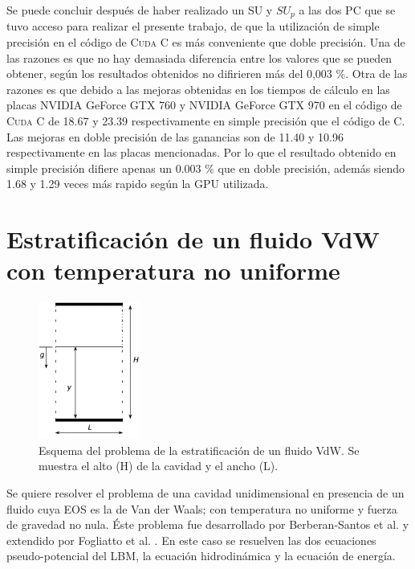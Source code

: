 Se puede concluir después de haber realizado un SU y $SU_p$ a las dos PC que se tuvo acceso para realizar el presente trabajo, de que la utilización de simple precisión en el código de \textsc{Cuda C} es más conveniente que doble precisión. Una de las razones es que no hay demasiada diferencia entre los valores que se pueden obtener, según los resultados obtenidos no difirieren más del 0,003 \%. Otra de las razones es que debido a las mejoras obtenidas en los tiempos de cálculo en las placas NVIDIA GeForce GTX 760 y NVIDIA GeForce GTX 970 en el código de \textsc{Cuda C} de 18.67 y 23.39 respectivamente en simple precisión que el código de \textsc{C}. Las mejoras en doble precisión de las ganancias son de 11.40 y 10.96 respectivamente en las placas mencionadas. Por lo que el resultado obtenido en simple precisión difiere apenas un 0.003 \% que en doble precisión, además siendo 1.68 y 1.29 veces más rapido según la GPU utilizada.

\newpage

\section{Estratificación de un fluido VdW con temperatura no uniforme}

\begin{figure}[htbp]
	\centering
	\includegraphics[width=0.3\textwidth]{figs/cap4/esquema_problema_VdW}
	\caption{Esquema del problema de la estratificación de un fluido VdW. Se muestra el alto (H) de la cavidad y el ancho (L).} 
	\label{fig:esquema_VdW}	
\end{figure}

Se quiere resolver el problema de una cavidad unidimensional en presencia de un fluido cuya EOS es la de Van der Waals; con temperatura  no uniforme y fuerza de gravedad no nula. Éste problema fue desarrollado por Berberan-Santos et al. \cite{berberan2002liquid} y extendido por Fogliatto et al. \cite{fogliatto2019simulation}. En este caso se resuelven las dos ecuaciones pseudo-potencial del LBM, la ecuación hidrodinámica y la ecuación de energía.

